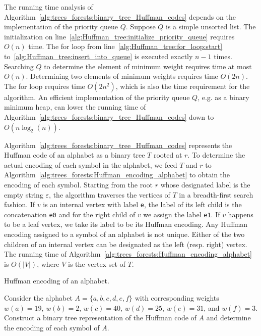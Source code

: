 The running time analysis of
Algorithm~\ref{alg:trees_forests:binary_tree_Huffman_codes} depends on
the implementation of the priority queue $Q$. Suppose $Q$ is a simple
unsorted list. The initialization on
line~\ref{alg:Huffman_tree:initialize_priority_queue} requires $O(n)$
time. The for loop from line~\ref{alg:Huffman_tree:for_loop:start}
to~\ref{alg:Huffman_tree:insert_into_queue} is executed exactly
$n - 1$ times. Searching $Q$ to determine the element of minimum
weight requires time at most $O(n)$. Determining two elements of
minimum weights requires time $O(2n)$. The for loop requires time
$O(2n^2)$, which is also the time requirement for the algorithm. An
efficient implementation of the priority queue $Q$, e.g. as a binary
minimum heap, can lower the running time of
Algorithm~\ref{alg:trees_forests:binary_tree_Huffman_codes} down to
$O(n \log_2(n))$.

Algorithm~\ref{alg:trees_forests:binary_tree_Huffman_codes} represents
the Huffman code of an alphabet as a binary tree $T$ rooted at $r$. To
determine the actual encoding of each symbol in the alphabet, we feed
$T$ and $r$ to
Algorithm~\ref{alg:trees_forests:Huffman_encoding_alphabet} to obtain
the encoding of each symbol. Starting from the root $r$ whose
designated label is the empty string $\varepsilon$, the algorithm
traverses the vertices of $T$ in a breadth-first search fashion. If
$v$ is an internal vertex with label \verb!e!, the label of its left
child is the concatenation \verb!e0! and for the right child of $v$ we
assign the label \verb!e1!. If $v$ happens to be a leaf vertex, we
take its label to be its Huffman encoding. Any Huffman encoding
assigned to a symbol of an alphabet is not unique. Either of the two
children of an internal vertex can be designated as the left
(resp. right) vertex. The running time of
Algorithm~\ref{alg:trees_forests:Huffman_encoding_alphabet} is
$O(|V|)$, where $V$ is the vertex set of $T$.

\begin{algorithm}[!htpb]

\caption{Huffman encoding of an alphabet.}
\label{alg:trees_forests:Huffman_encoding_alphabet}
\end{algorithm}

\begin{example}
Consider the alphabet $A = \{a, b, c, d, e, f\}$ with corresponding
weights $w(a) = 19$, $w(b) = 2$, $w(c) = 40$, $w(d) = 25$,
$w(e) = 31$, and $w(f) = 3$. Construct a binary tree representation of
the Huffman code of $A$ and determine the encoding of each symbol of
$A$.
\end{example}

